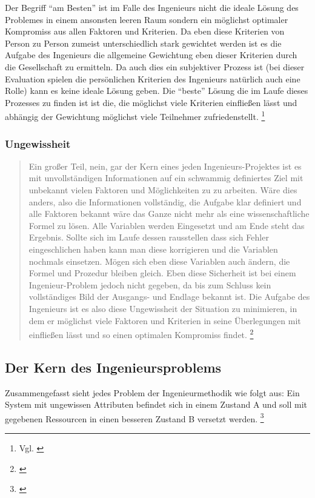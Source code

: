     Der Begriff “am Besten” ist im Falle des Ingenieurs nicht die ideale 
    Lösung des Problemes in einem ansonsten leeren Raum sondern ein möglichst optimaler Kompromiss 
    aus allen Faktoren und Kriterien. Da eben diese Kriterien von Person zu Person zumeist 
    unterschiedlich stark gewichtet werden ist es die Aufgabe des Ingenieurs die allgemeine 
    Gewichtung eben dieser Kriterien durch die Gesellschaft zu ermitteln. Da auch dies ein subjektiver 
    Prozess ist (bei dieser Evaluation  spielen die persönlichen Kriterien des Ingenieurs natürlich 
    auch eine Rolle) kann es keine ideale Lösung geben. Die “beste” Lösung die im Laufe dieses 
    Prozesses zu finden ist ist die, die möglichst viele Kriterien einfließen lässt und abhängig 
    der Gewichtung möglichst viele Teilnehmer zufriedenstellt. \footnote{Vgl. \cite[S. 35]{bock2001}}
       

    \subsubsection{Ungewissheit}

    \begin{quote}
        Ein großer Teil, nein, gar der Kern eines jeden Ingenieurs-Projektes ist es mit unvollständigen 
    Informationen auf ein schwammig definiertes Ziel mit unbekannt vielen Faktoren und Möglichkeiten 
    zu zu arbeiten. Wäre dies anders, also die Informationen vollständig, die Aufgabe klar definiert 
    und alle Faktoren bekannt wäre das Ganze nicht mehr als eine wissenschaftliche Formel zu lösen. 
    Alle Variablen werden Eingesetzt und am Ende steht das Ergebnis. Sollte sich im Laufe dessen 
    rausstellen dass sich Fehler eingeschlichen haben kann man diese korrigieren und die Variablen 
    nochmals einsetzen. Mögen sich eben diese Variablen auch ändern, die Formel und Prozedur bleiben 
    gleich. Eben diese Sicherheit ist bei einem Ingenieur-Problem jedoch nicht gegeben, da bis zum 
    Schluss kein vollständiges Bild der Ausgangs- und Endlage bekannt ist.
    Die Aufgabe des Ingenieurs ist es also diese Ungewissheit der Situation zu minimieren, in dem er 
    möglichst viele Faktoren und Kriterien in seine Überlegungen mit einfließen lässt und so einen 
    optimalen Kompromiss findet. \footnote{ \cite[S. 112]{koen2013}}
    \end{quote}
     


    \subsection{Der Kern des Ingenieursproblems}

    Zusammengefasst sieht jedes Problem der Ingenieurmethodik wie folgt aus: Ein System mit 
    ungewissen Attributen befindet sich in einem Zustand A und soll mit gegebenen Ressourcen in 
    einen besseren Zustand B versetzt werden. \footnote{ \cite{method}}


